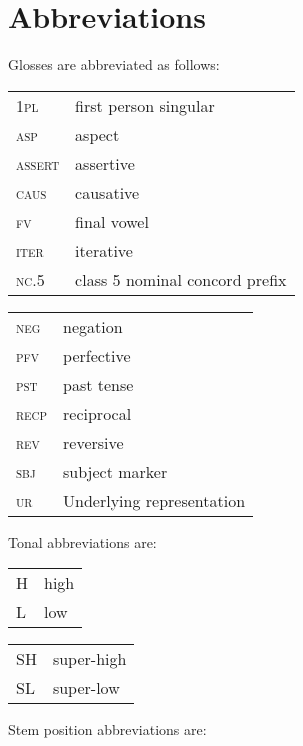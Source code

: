 \documentclass[output=paper,newtxmath,modfonts,nonflat,draft]{langsci/langscibook}
\begin{document}
\section*{Abbreviations}
 
 
 
 
 
Glosses are abbreviated as follows:\\
\medskip

\begin{tabularx}{.45\textwidth}{lQ} 
\textsc{1pl}    &    {first person} singular\\
\textsc{asp}    &    {aspect}\\
\textsc{assert}  &    assertive\\
\textsc{caus}  &    causative\\
\textsc{fv}    &    {final vowel}\\
\textsc{iter}    &  iterative\\
\textsc{nc}.5   &   class 5 nominal concord prefix\\ 
\end{tabularx}
\begin{tabularx}{.45\textwidth}{lQ}
\textsc{neg}    &   {negation}\\
\textsc{pfv}    &   {perfective}\\
\textsc{pst}    &   {past tense}\\
\textsc{recp}  &   reciprocal\\
\textsc{rev}  &   reversive\\
\textsc{sbj}  &  {subject marker} \\
\textsc{ur}  &   {Underlying representation}  
\end{tabularx}
\medskip

 
\noindent Tonal abbreviations are:\\
\medskip


\begin{tabularx}{.45\textwidth}{lQ}
H     &  high\\
L     &  low\\
\end{tabularx}
\begin{tabularx}{.45\textwidth}{lQ}
SH  &  super-high\\
SL   &  super-low
\end{tabularx}
\medskip


\noindent Stem position abbreviations are:\\
\medskip
\end{document}
